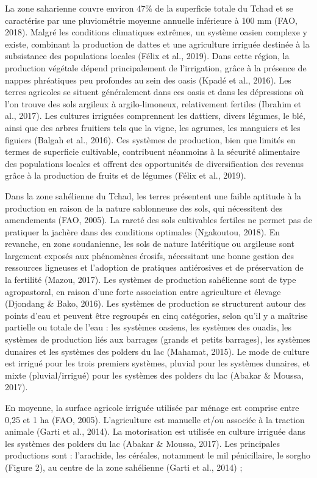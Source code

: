 \documentclass[12pt,oneside]{report}
\begin{document}
La zone saharienne couvre environ 47\% de la superficie totale du Tchad et se caractérise par une pluviométrie moyenne annuelle inférieure à 100 mm (FAO, 2018). Malgré les conditions climatiques extrêmes, un système oasien complexe y existe, combinant la production de dattes et une agriculture irriguée destinée à la subsistance des populations locales (Félix et al., 2019). Dans cette région, la production végétale dépend principalement de l'irrigation, grâce à la présence de nappes phréatiques peu profondes au sein des oasis (Kpadé et al., 2016). Les terres agricoles se situent généralement dans ces oasis et dans les dépressions où l'on trouve des sols argileux à argilo-limoneux, relativement fertiles (Ibrahim et al., 2017). Les cultures irriguées comprennent les dattiers, divers légumes, le blé, ainsi que des arbres fruitiers tels que la vigne, les agrumes, les manguiers et les figuiers (Balgah et al., 2016). Ces systèmes de production, bien que limités en termes de superficie cultivable, contribuent néanmoins à la sécurité alimentaire des populations locales et offrent des opportunités de diversification des revenus grâce à la production de fruits et de légumes (Félix et al., 2019).

Dans la zone sahélienne du Tchad, les terres présentent une faible aptitude à la production en raison de la nature sablonneuse des sols, qui nécessitent des amendements (FAO, 2005). La rareté des sols cultivables fertiles ne permet pas de pratiquer la jachère dans des conditions optimales (Ngakoutou, 2018). En revanche, en zone soudanienne, les sols de nature latéritique ou argileuse sont largement exposés aux phénomènes érosifs, nécessitant une bonne gestion des ressources ligneuses et l'adoption de pratiques antiérosives et de préservation de la fertilité (Mazou, 2017). Les systèmes de production sahélienne sont de type agropastoral, en raison d'une forte association entre agriculture et élevage (Djondang \& Bako, 2016). Les systèmes de production se structurent autour des points d'eau et peuvent être regroupés en cinq catégories, selon qu'il y a maîtrise partielle ou totale de l'eau : les systèmes oasiens, les systèmes des ouadis, les systèmes de production liés aux barrages (grands et petits barrages), les systèmes dunaires et les systèmes des polders du lac (Mahamat, 2015). Le mode de culture est irrigué pour les trois premiers systèmes, pluvial pour les systèmes dunaires, et mixte (pluvial/irrigué) pour les systèmes des polders du lac (Abakar \& Moussa, 2017).

En moyenne, la surface agricole irriguée utilisée par ménage est comprise entre 0,25 et 1 ha (FAO, 2005). L'agriculture est manuelle et/ou associée à la traction animale (Garti et al., 2014). La motorisation est utilisée en culture irriguée dans les systèmes des polders du lac (Abakar \& Moussa, 2017). Les principales productions sont : l'arachide, les céréales, notamment le mil pénicillaire, le sorgho (Figure 2), au centre de la zone sahélienne (Garti et al., 2014) ;
\end{document}
